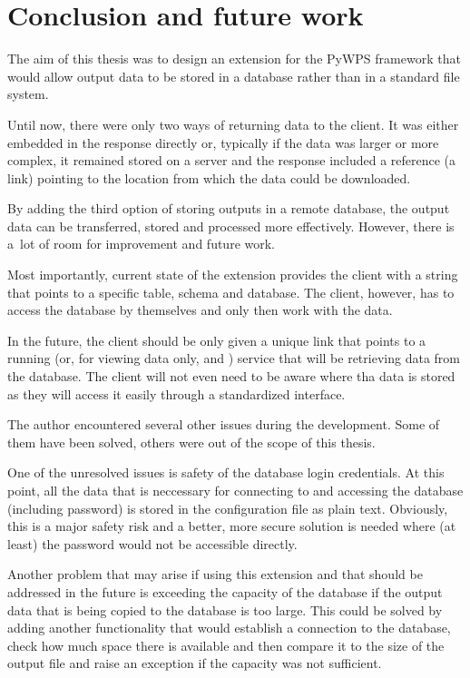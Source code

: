 \chapter{Conclusion and future work}
\label{5-conclusion}


The aim of this thesis was to design an extension for the PyWPS
framework that would allow output data to be stored in a database
rather than in a standard file system.

Until now, there were only two ways of returning data to the
client. It was either embedded in the response directly or, typically
if the data was larger or more complex, it remained stored on a server
and the response included a reference (a~ link) pointing to
the location from which the data could be downloaded.

By adding the third option of storing outputs in a remote database,
the output data can be transferred, stored and processed more
effectively. However, there is a~lot of room for improvement and
future work.

Most importantly, current state of the extension provides the client
with a string that points to a specific table, schema and
database. The client, however, has to access the database by
themselves and only then work with the data.

In the future, the client should be only given a unique  link
that points to a running  (or, for viewing data only,  
and ) service that will be retrieving data from the database. 
The client will not even need to be aware where tha data is stored 
as they will access it easily through a standardized interface.

The author encountered several other issues during the
development. Some of them have been solved, others were out of the
scope of this thesis.

One of the unresolved issues is safety of the database login
credentials. At this point, all the data that is neccessary for
connecting to and accessing the database (including password) is
stored in the configuration file as plain text. Obviously, this is a
major safety risk and a better, more secure solution is needed where
(at least) the password would not be accessible directly.

Another problem that may arise if using this extension and that should
be addressed in the future is exceeding the capacity of the database
if the output data that is being copied to the database is too
large. This could be solved by adding another functionality that would
establish a connection to the database, check how much space there is
available and then compare it to the size of the output file and raise
an exception if the capacity was not sufficient.

